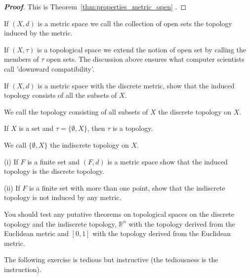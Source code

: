 \begin{proof}[\bf Proof] This is Theorem~\ref{thm:properties_metric_open} .
\end{proof}
If $(X,d)$ is a metric space we call the collection of
open sets the topology induced by the metric.

If $(X,\tau)$ is a topological space we extend the notion of
open set by calling the members of $\tau$ open sets.
The discussion above ensures what computer scientists call
'downward compatibility'.

\begin{problem} If $(X,d)$ is a metric space with the
discrete metric, show that the induced topology consists
of all the subsets of $X$.
\end{problem}
We call the topology consisting of all subsets of $X$
the discrete topology on $X$.

\begin{problem}\label{E;indiscrete}
If $X$ is a set and $\tau=\{\emptyset,X\}$,
then $\tau$ is a topology.
\end{problem}
We call $\{\emptyset,X\}$ the indiscrete topology on $X$.

\begin{problem} (i) If $F$ is a  finite set
and $(F,d)$ is a metric space show that the induced
topology is the discrete topology.

(ii) If $F$ is a finite set with more than one point,
show that the indiscrete topology is not induced by any
metric.
\end{problem}

You should test any putative theorems on topological spaces
on the discrete topology and the indiscrete topology,
${\mathbb R}^{n}$ with the topology derived from
the Euclidean metric and
$[0,1]$ with the topology derived from
the Euclidean metric.

The following exercise is tedious but instructive (the tediousness is the instruction).


